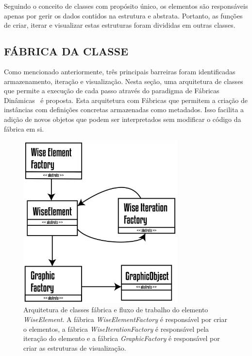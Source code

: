 Seguindo o conceito de classes com propósito único, os elementos são responsáveis apenas por gerir os dados contidos na estrutura e abstrata. Portanto, as funções de criar, iterar e visualizar estas estruturas foram divididas em outras classes.

\subsection{FÁBRICA DA CLASSE}\label{sec:fabrica} 

Como mencionado anteriormente, três principais barreiras foram identificadas armazenamento, iteração e visualização. Nesta seção, uma arquitetura de classes que permite a execução de cada passo através do paradigma de Fábricas Dinâmicas~ \cite{factorypattern} é proposta. Esta arquitetura com Fábricas que permitem a criação de instâncias com definições concretas armazenadas como metadados. Isso facilita a adição de novos objetos que podem ser interpretados sem modificar o código da fábrica em si. 


\begin{figure}[!htbp]
	\centering
	\includegraphics[width=0.75\textwidth]{Figures/WiseElementWorkflow@16x.png}
	\caption{Arquitetura de classes fábrica e fluxo de trabalho do elemento \textit{WiseElement}. A fábrica \textit{WiseElementFactory} é responsável por criar o elementos, a fábrica \textit{WiseIterationFactory} é responsável pela iteração do elemento e a fábrica \textit{GraphicFactory} é responsável por criar as estruturas de visualização. }
	\label{fig2:wiselementsworkflow}
\end{figure}

